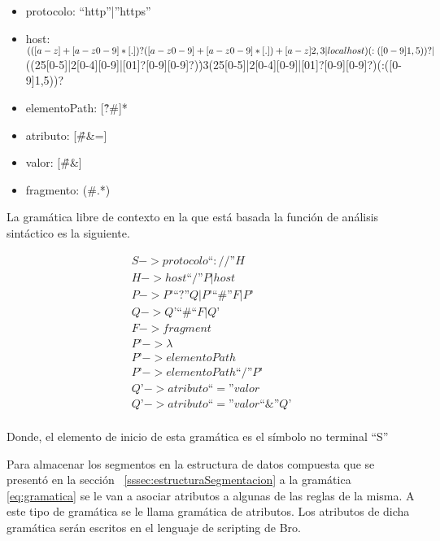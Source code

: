 \begin{itemize}
\item protocolo: “http”|”https”
\item host: $(([a-z]+[a-z0-9\-]*[.])?([a-z0-9]+[a-z0-9\-]*[.])+[a-z]{2,3}|localhost)(:([0-9]{1,5}))?|$\\ ((25[0-5]|2[0-4][0-9]|[01]?[0-9][0-9]?)\.){3}(25[0-5]|2[0-4][0-9]|[01]?[0-9][0-9]?)(:([0-9]{1,5}))?
\item elementoPath: [\^?\#]*
\item atributo: [\^\#\&=]
\item valor: [\^\#\&]
\item fragmento: (\#.*)
\end{itemize}

La gramática libre de contexto en la que está basada la función de análisis sintáctico es la siguiente.

\begin{equation}\label{eq:gramatica}
\begin{aligned}
S -> protocolo “ :// ” H  \\
H -> host “/” P | host \\
P -> P’ “?” Q | P’ “\#” F | P’ \\
Q -> Q’ “\#“ F | Q’ \\
F -> fragment \\
P’ -> \lambda \\
P’ ->  elementoPath \\
P’ -> elementoPath “/” P’ \\
Q’ -> atributo “=” valor \\
Q’ -> atributo “=” valor “\&” Q’ \\
\end{aligned}
\end{equation}

Donde, el elemento de inicio de esta gramática es el símbolo no terminal “S”

Para almacenar los segmentos en la estructura de datos compuesta que se presentó en la sección ~\ref{sssec:estructuraSegmentacion} a la gramática \ref{eq:gramatica} se le van a asociar atributos a algunas de las reglas de la misma. A este tipo de gramática se le llama gramática de atributos. Los atributos de dicha gramática serán escritos en el lenguaje de scripting de Bro.

